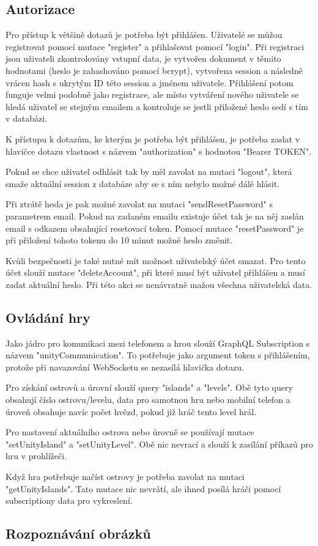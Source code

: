 \subsection{Autorizace}
Pro přístup k většině dotazů je potřeba být přihlášen. Uživatelé se můžou registrovat pomocí mutace "register" a přihlašovat pomocí "login". Při registraci jsou uživateli zkontrolovány vstupní data, je vytvořen dokument v těmito hodnotami (heslo je zahashováno pomocí bcrypt\cite{bcrypt}), vytvořena session a následně vrácen hash s ukrytým ID této session a jménem uživatele. Přihlášení potom funguje velmi podobně jako registrace, ale místo vytváření nového uživatele se hledá uživatel se stejným emailem a kontroluje se jestli přiložené heslo sedí s tím v databázi.\par
K přístupu k dotazům, ke kterým je potřeba být přihlášen, je potřeba zaslat v hlavičce dotazu vlastnost s názvem "authorization" s hodnotou "Bearer TOKEN".\par
Pokud se chce uživatel odhlásit tak by měl zavolat na mutaci "logout", která smaže aktuální session z databáze aby se s ním nebylo možné dálé hlásit.\par
Při ztrátě hesla je pak možné zavolat na mutaci "sendResetPassword" s parametrem email. Pokud na zadaném emailu existuje účet tak je na něj zaslán email s odkazem obsahující resetovací token. Pomocí mutace "resetPassword" je při přiložení tohoto tokenu do 10 minut možné heslo změnit.\par
Kvůli bezpečnosti je také nutné mít možnost uživatelský účet smazat. Pro tento účet slouží mutace "deleteAccount", při které musí být uživatel přihlášen a musí zadat aktuální heslo. Při této akci se nenávratně mažou všechna uživatelská data.

\subsection{Ovládání hry}
Jako jádro pro komunikaci mezi telefonem a hrou slouží GraphQL Subscription s názvem "unityCommunication". To potřebuje jako argument token s přihlášením, protože při navazování WebSocketu se nezasílá hlavička dotazu.\par
Pro získání ostrovů a úrovní slouží query "islands" a "levels". Obě tyto query obsahují číslo ostrovu/levelu, data pro samotnou hru nebo mobilní telefon a úroveň obsahuje navíc počet hvězd, pokud již hráč tento level hrál.\par
Pro nastavení aktuálního ostrova nebo úrovně se používají mutace "setUnityIsland" a "setUnityLevel". Obě nic nevrací a slouží k zasílání příkazů pro hru v prohlížeči.\par
Když hra potřebuje načíst ostrovy je potřeba zavolat na mutaci "getUnityIslands". Tato mutace nic nevrátí, ale ihned posílá hráči pomocí subscriptiony data pro vykreslení.

\subsection{Rozpoznávání obrázků}